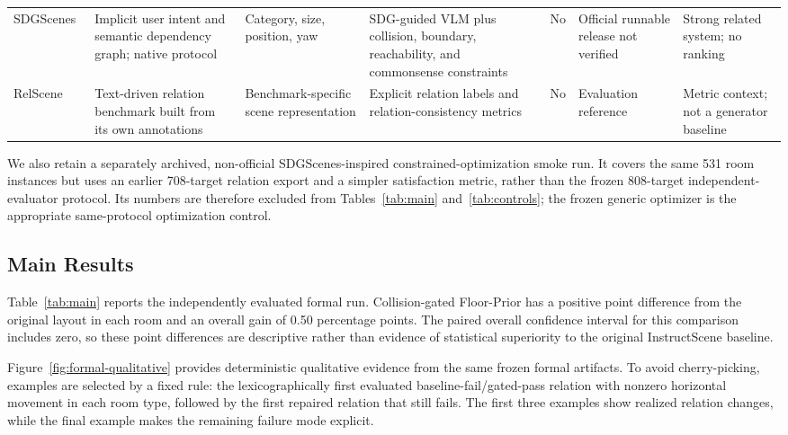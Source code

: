 \documentclass{egpubl}
\newcommand{\fp}{Floor-Prior}
\begin{document}
\begin{table}[t]
\begin{tabularx}{\textwidth}{p{2.05cm}X p{2.25cm}p{2.9cm}p{1.1cm}p{2.15cm}X}
SDGScenes~\cite{gao2026sdgscenes} & Implicit user intent and semantic dependency graph; native protocol & Category, size, position, yaw & SDG-guided VLM plus collision, boundary, reachability, and commonsense constraints & No & Official runnable release not verified & Strong related system; no ranking \\
RelScene~\cite{ye2024relscene} & Text-driven relation benchmark built from its own annotations & Benchmark-specific scene representation & Explicit relation labels and relation-consistency metrics & No & Evaluation reference & Metric context; not a generator baseline \\
\bottomrule
\end{tabularx}
\end{table}

We also retain a separately archived, non-official SDGScenes-inspired constrained-optimization smoke run. It covers the same 531 room instances but uses an earlier 708-target relation export and a simpler satisfaction metric, rather than the frozen 808-target independent-evaluator protocol. Its numbers are therefore excluded from Tables~\ref{tab:main} and~\ref{tab:controls}; the frozen generic optimizer is the appropriate same-protocol optimization control.

\subsection{Main Results}

Table~\ref{tab:main} reports the independently evaluated formal run. Collision-gated \fp{} has a positive point difference from the original layout in each room and an overall gain of 0.50 percentage points. The paired overall confidence interval for this comparison includes zero, so these point differences are descriptive rather than evidence of statistical superiority to the original InstructScene baseline.

Figure~\ref{fig:formal-qualitative} provides deterministic qualitative evidence from the same frozen formal artifacts. To avoid cherry-picking, examples are selected by a fixed rule: the lexicographically first evaluated baseline-fail/gated-pass relation with nonzero horizontal movement in each room type, followed by the first repaired relation that still fails. The first three examples show realized relation changes, while the final example makes the remaining failure mode explicit.
\end{document}
